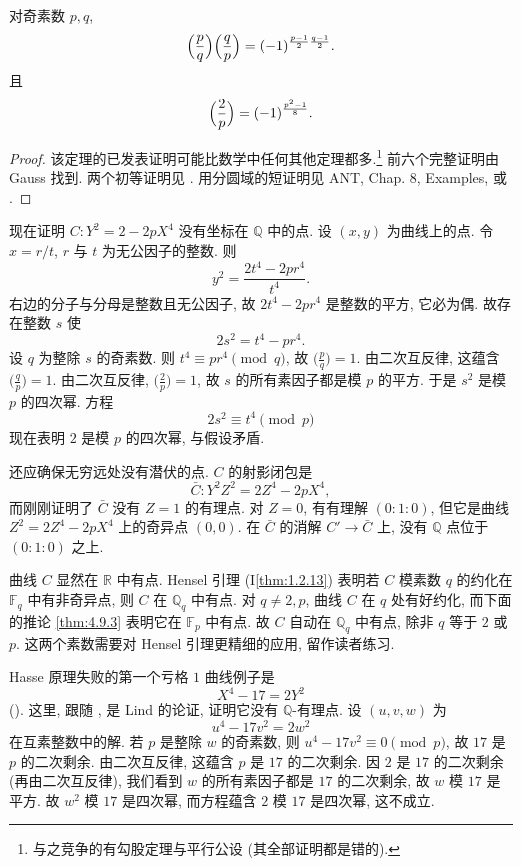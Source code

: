 \begin{theorem}[二次互反律] \label{thm:4.8.5} 
对奇素数 $p, q$,
\[
\Bigl(\frac{p}{q}\Bigr)\Bigl(\frac{q}{p}\Bigr) = (-1)^{\frac{p-1}{2}\frac{q-1}{2}}.
\]
且
\[
\Bigl(\frac{2}{p}\Bigr) = (-1)^{\frac{p^2-1}{8}}.
\]
\end{theorem}

\begin{proof}
该定理的已发表证明可能比数学中任何其他定理都多.\footnote{与之竞争的有勾股定理与平行公设 (其全部证明都是错的).} 前六个完整证明由 Gauss 找到. 两个初等证明见 \cite[Chapter I]{serre1973}. 用分圆域的短证明见 ANT, Chap. 8, Examples, 或 \cite[\S 6.5]{samuel2008}.
\end{proof}

现在证明 $C\colon Y^2 = 2 - 2pX^4$ 没有坐标在 $\mathbb{Q}$ 中的点. 设 $(x, y)$ 为曲线上的点. 令 $x = r/t$, $r$ 与 $t$ 为无公因子的整数. 则
\[
y^2 = \frac{2t^4 - 2pr^4}{t^4}.
\]
右边的分子与分母是整数且无公因子, 故 $2t^4 - 2pr^4$ 是整数的平方, 它必为偶. 故存在整数 $s$ 使
\[
2s^2 = t^4 - pr^4.
\]
设 $q$ 为整除 $s$ 的奇素数. 则 $t^4\equiv pr^4\pmod{q}$, 故 $\bigl(\frac{p}{q}\bigr) = 1$. 由二次互反律, 这蕴含 $\bigl(\frac{q}{p}\bigr) = 1$. 由二次互反律, $\bigl(\frac{2}{p}\bigr) = 1$, 故 $s$ 的所有素因子都是模 $p$ 的平方. 于是 $s^2$ 是模 $p$ 的四次幂. 方程
\[
2s^2\equiv t^4 \pmod{p}
\]
现在表明 $2$ 是模 $p$ 的四次幂, 与假设矛盾.

还应确保无穷远处没有潜伏的点. $C$ 的射影闭包是
\[
\bar{C}\colon Y^2Z^2 = 2Z^4 - 2pX^4,
\]
而刚刚证明了 $\bar{C}$ 没有 $Z = 1$ 的有理点. 对 $Z = 0$, 有有理解 $(0:1:0)$, 但它是曲线 $Z^2 = 2Z^4 - 2pX^4$ 上的奇异点 $(0,0)$. 在 $\bar{C}$ 的消解 $C'\to\bar{C}$ 上, 没有 $\mathbb{Q}$ 点位于 $(0:1:0)$ 之上.

曲线 $C$ 显然在 $\mathbb{R}$ 中有点. Hensel 引理 (I\ref{thm:1.2.13}) 表明若 $C$ 模素数 $q$ 的约化在 $\mathbb{F}_q$ 中有非奇异点, 则 $C$ 在 $\mathbb{Q}_q$ 中有点. 对 $q\neq 2, p$, 曲线 $C$ 在 $q$ 处有好约化, 而下面的推论 \ref{thm:4.9.3} 表明它在 $\mathbb{F}_p$ 中有点. 故 $C$ 自动在 $\mathbb{Q}_q$ 中有点, 除非 $q$ 等于 $2$ 或 $p$. 这两个素数需要对 Hensel 引理更精细的应用, 留作读者练习.

\begin{remarkstar}
Hasse 原理失败的第一个亏格 $1$ 曲线例子是
\[
X^4 - 17 = 2Y^2
\]
(\cite{lind1940}). 这里, 跟随 \cite{cassels1966}, 是 Lind 的论证, 证明它没有 $\mathbb{Q}$-有理点. 设 $(u, v, w)$ 为
\[
u^4 - 17v^2 = 2w^2
\]
在互素整数中的解. 若 $p$ 是整除 $w$ 的奇素数, 则 $u^4 - 17v^2\equiv 0\pmod{p}$, 故 $17$ 是 $p$ 的二次剩余. 由二次互反律, 这蕴含 $p$ 是 $17$ 的二次剩余. 因 $2$ 是 $17$ 的二次剩余 (再由二次互反律), 我们看到 $w$ 的所有素因子都是 $17$ 的二次剩余, 故 $w$ 模 $17$ 是平方. 故 $w^2$ 模 $17$ 是四次幂, 而方程蕴含 $2$ 模 $17$ 是四次幂, 这不成立.
\end{remarkstar}

